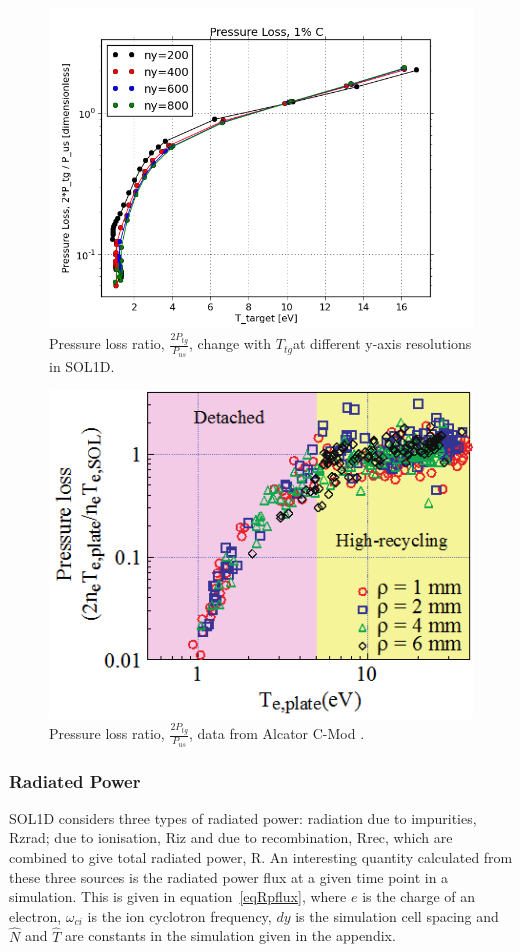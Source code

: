 \documentclass[11pt]{article}  %
\providecommand{\Ttg}{$T_{tg}$} %
\begin{document}
\begin{figure}
\includegraphics[scale=0.5]{Figures/sol1d/PL_IMPCOMBO2logy.png}
\centering
\caption{Pressure loss ratio, $\frac{2P_{tg}}{P_{us}}$, change with \Ttg at different y-axis resolutions in SOL1D.}\label{figPL_IMPCOMBO2logy}
\end{figure}

\begin{figure}
\includegraphics[scale=0.7]{Figures/PlossAlcator.png}
\centering
\caption{Pressure loss ratio, $\frac{2P_{tg}}{P_{us}}$, data from Alcator C-Mod \cite{Lipschultz2007}.}\label{figPlossAlcator}
\end{figure}



\subsubsection{Radiated Power}\label{sssecRpower}
SOL1D considers three types of radiated power: radiation due to impurities, Rzrad; due to ionisation, Riz and due to recombination, Rrec, which are combined to give total radiated power, R. An interesting quantity calculated from these three sources is the radiated power flux at a given time point in a simulation. This is given in equation~\ref{eqRpflux}, where $e$ is the charge of an electron, $\omega_{ci}$ is the ion cyclotron frequency, $dy$ is the simulation cell spacing and $\hat{N}$ and $\hat{T}$ are constants in the simulation given in the appendix. 
\end{document}
